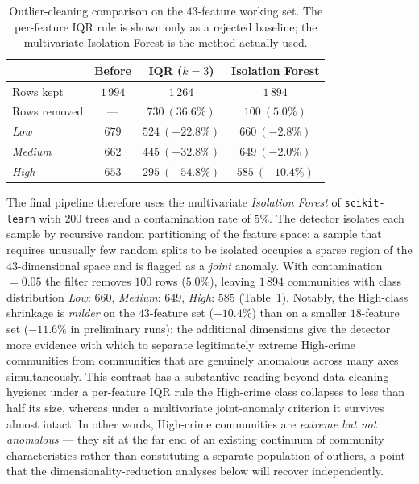 \documentclass{ieeeaccess}
\begin{document}
\begin{table}[!t]
\caption{Outlier-cleaning comparison on the $43$-feature working set. The per-feature IQR rule is shown only as a rejected baseline; the multivariate Isolation Forest is the method actually used.}
\label{tab:outlier}
\centering
\small
\begin{tabular}{lccc}
\toprule
 & Before & IQR ($k=3$) & Isolation Forest \\
\midrule
Rows kept            & $1\,994$ & $1\,264$ & $1\,894$ \\
Rows removed         & ---      & $730\ (36.6\%)$ & $100\ (5.0\%)$ \\
\midrule
\emph{Low}           & $679$ & $524\ (-22.8\%)$ & $660\ (-2.8\%)$ \\
\emph{Medium}        & $662$ & $445\ (-32.8\%)$ & $649\ (-2.0\%)$ \\
\emph{High}          & $653$ & $295\ (-54.8\%)$ & $585\ (-10.4\%)$ \\
\bottomrule
\end{tabular}
\end{table}

The final pipeline therefore uses the multivariate \emph{Isolation Forest} \cite{liu2008isolation} of \texttt{scikit-learn} \cite{pedregosa} with $200$ trees and a contamination rate of $5\%$. The detector isolates each sample by recursive random partitioning of the feature space; a sample that requires unusually few random splits to be isolated occupies a sparse region of the $43$-dimensional space and is flagged as a \emph{joint} anomaly. With contamination $=0.05$ the filter removes $100$ rows ($5.0\%$), leaving $1\,894$ communities with class distribution \emph{Low}: $660$, \emph{Medium}: $649$, \emph{High}: $585$ (Table~\ref{tab:outlier}). Notably, the High-class shrinkage is \emph{milder} on the $43$-feature set ($-10.4\%$) than on a smaller $18$-feature set ($-11.6\%$ in preliminary runs): the additional dimensions give the detector more evidence with which to separate legitimately extreme High-crime communities from communities that are genuinely anomalous across many axes simultaneously. This contrast has a substantive reading beyond data-cleaning hygiene: under a per-feature IQR rule the High-crime class collapses to less than half its size, whereas under a multivariate joint-anomaly criterion it survives almost intact. In other words, High-crime communities are \emph{extreme but not anomalous} --- they sit at the far end of an existing continuum of community characteristics rather than constituting a separate population of outliers, a point that the dimensionality-reduction analyses below will recover independently.
\end{document}
